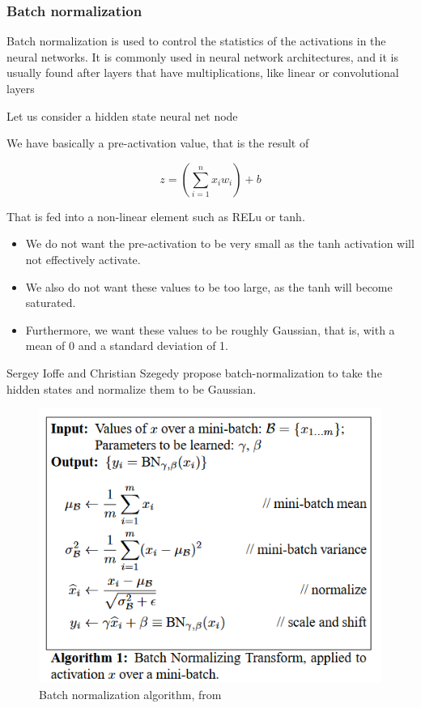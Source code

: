 		\bigskip
		\subsubsection{Batch normalization}
		
		Batch normalization is used to control the statistics of the activations in the neural networks. It is commonly used in neural network architectures, and it is usually found after layers that have multiplications, like linear or convolutional layers 
		
		Let us consider a hidden state neural net node
		
		We have basically a pre-activation value, that is the result of 
		
		$$
		z = \left(\sum_{i=1}^{n} x_i w_i \right)+ b
		$$
		
		That is fed into a non-linear element such as RELu or tanh.
		
		\begin{itemize}
			\item We do not want the pre-activation to be very small as the tanh activation will not effectively activate.
			\item We also do not want these values to be too large, as the tanh will become saturated.
			\item Furthermore, we want these values to be roughly Gaussian, that is, with a mean of 0 and a standard deviation of 1.
		\end{itemize}
		\bigskip
		
		Sergey Ioffe and Christian Szegedy propose batch-normalization \cite{ioffe2015batch} to take the hidden states and normalize them to be Gaussian.
		
		\begin{figure}
			\centering
			\includegraphics[width=0.7\linewidth]{img/img-ioffeBatchNormalizationAccelerating2015-1}
			\caption{Batch normalization algorithm, from \cite{ioffe2015batch}}
			\label{fig:img-ioffebatchnormalizationaccelerating2015-1}
		\end{figure}
		

